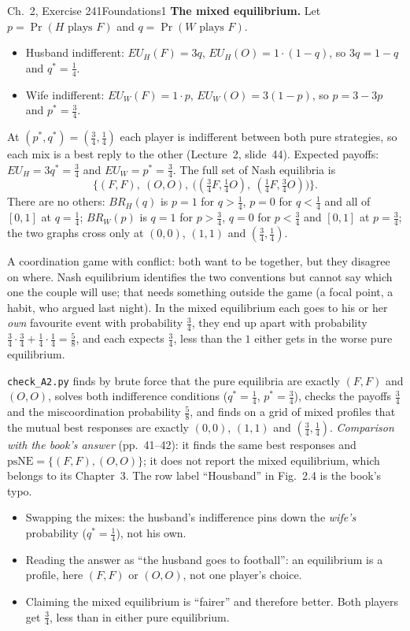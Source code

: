 \begin{exsol}{\MG{} Ch.~2, Exercise 2}{41}{Foundations}{1}
\textbf{The mixed equilibrium.} Let $p = \Pr(H \text{ plays } F)$ and $q = \Pr(W \text{ plays } F)$.
\begin{itemize}
  \item Husband indifferent: $EU_H(F) = 3q$, $EU_H(O) = 1\cdot(1-q)$, so $3q = 1 - q$ and
  $q^* = \tfrac14$.
  \item Wife indifferent: $EU_W(F) = 1\cdot p$, $EU_W(O) = 3(1-p)$, so $p = 3 - 3p$ and
  $p^* = \tfrac34$.
\end{itemize}
At $(p^*, q^*) = (\tfrac34, \tfrac14)$ each player is indifferent between both pure strategies,
so each mix is a best reply to the other (Lecture~2, slide~44). Expected payoffs:
$EU_H = 3q^* = \tfrac34$ and $EU_W = p^* = \tfrac34$. The full set of Nash equilibria is
\[
  \Big\{(F,F),\ (O,O),\ \big((\tfrac34 F, \tfrac14 O),\ (\tfrac14 F, \tfrac34 O)\big)\Big\}.
\]
There are no others: $BR_H(q)$ is $p = 1$ for $q > \tfrac14$, $p = 0$ for $q < \tfrac14$ and all
of $[0,1]$ at $q = \tfrac14$; $BR_W(p)$ is $q = 1$ for $p > \tfrac34$, $q = 0$ for $p < \tfrac34$ and
$[0,1]$ at $p = \tfrac34$; the two graphs cross only at $(0,0)$, $(1,1)$ and $(\tfrac34,\tfrac14)$.

\interp A coordination game with conflict: both want to be together, but they disagree on where.
Nash equilibrium identifies the two conventions but cannot say which one the couple will use;
that needs something outside the game (a focal point, a habit, who argued last night). In the mixed
equilibrium each goes to his or her \emph{own} favourite event with probability $\tfrac34$, they
end up apart with probability $\tfrac34\cdot\tfrac34 + \tfrac14\cdot\tfrac14 = \tfrac58$, and each
expects $\tfrac34$, less than the $1$ either gets in the worse pure equilibrium.

\verify \texttt{check\_A2.py} finds by brute force that the pure equilibria are exactly $(F,F)$
and $(O,O)$, solves both indifference conditions ($q^* = \tfrac14$, $p^* = \tfrac34$), checks the
payoffs $\tfrac34$ and the miscoordination probability $\tfrac58$, and finds on a grid of mixed
profiles that the mutual best responses are exactly $(0,0)$, $(1,1)$ and $(\tfrac34, \tfrac14)$.
\emph{Comparison with the book's answer} (pp.~41--42): it finds the same best responses and
$\text{psNE} = \{(F,F), (O,O)\}$; it does not report the mixed equilibrium, which belongs to its
Chapter~3. The row label ``Housband'' in Fig.~2.4 is the book's typo.

\mistakes
\begin{itemize}
  \item Swapping the mixes: the husband's indifference pins down the \emph{wife's} probability
  ($q^* = \tfrac14$), not his own.
  \item Reading the answer as ``the husband goes to football'': an equilibrium is a profile, here
  $(F,F)$ or $(O,O)$, not one player's choice.
  \item Claiming the mixed equilibrium is ``fairer'' and therefore better. Both players get
  $\tfrac34$, less than in either pure equilibrium.
\end{itemize}


\end{exsol}
